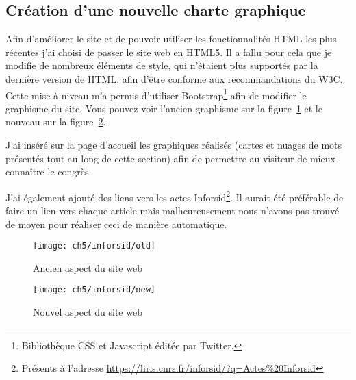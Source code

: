 			
		\subsection{Création d'une nouvelle charte graphique}
			Afin d'améliorer le site et de pouvoir utiliser les fonctionnalités HTML les plus récentes j'ai choisi de passer le site web en HTML5. Il a fallu pour cela que je modifie de nombreux éléments de style, qui n'étaient plus supportés par la dernière version de HTML, afin d'être conforme aux recommandations du W3C. Cette mise à niveau m'a permis d'utiliser Bootstrap\footnote{Bibliothèque CSS et Javascript éditée par Twitter.} afin de modifier le graphisme du site. Vous pouvez voir l'ancien graphisme sur la figure~\ref{fig:old} et le nouveau sur la figure~\ref{fig:new}.
			
			J'ai inséré sur la page d'accueil les graphiques réalisés (cartes et nuages de mots présentés tout au long de cette section) afin de permettre au visiteur de mieux connaître le congrès.
		
			J'ai également ajouté des liens vers les actes Inforsid\footnote{Présents à l'adresse \url{https://liris.cnrs.fr/inforsid/?q=Actes\%20Inforsid}}. Il aurait été préférable de faire un lien vers chaque article mais malheureusement nous n'avons pas trouvé de moyen pour réaliser ceci de manière automatique.
			
			\begin{figure}[p]
				\centering
				\texttt{[image: ch5/inforsid/old]}
				\caption{Ancien aspect du site web}\label{fig:old}
			\end{figure}
			
			\begin{figure}[p]
				\centering
				\texttt{[image: ch5/inforsid/new]}
				\caption{Nouvel aspect du site web}\label{fig:new}
			\end{figure}

